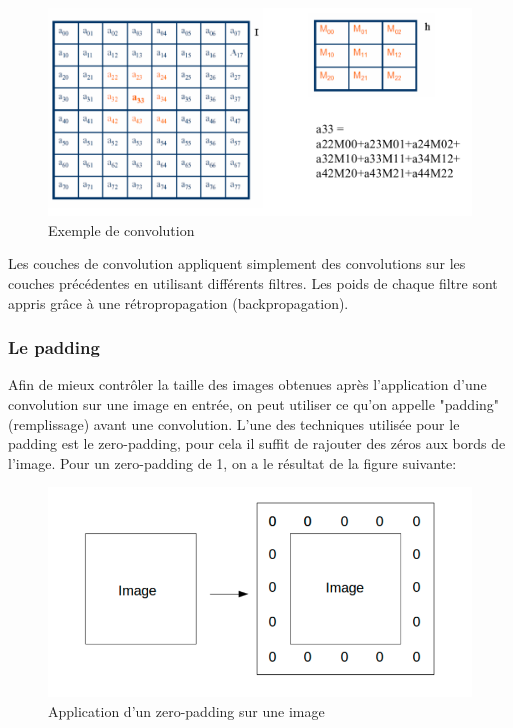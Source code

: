 \begin{figure}[H]
	\centering
		\includegraphics[width=5in]{Figures/convAouat.png}
	\caption[An Electron]{Exemple de convolution}
	\label{fig:Electron}
\end{figure}



Les couches de convolution appliquent simplement des convolutions sur les couches précédentes en utilisant différents filtres. Les poids de chaque filtre sont appris grâce à une rétropropagation (backpropagation).

\subsubsection{Le padding}
Afin de mieux contrôler la taille des images obtenues après l'application d'une convolution sur une image en entrée, on peut utiliser ce qu'on appelle "padding" (remplissage) avant une convolution.
L'une des techniques utilisée pour le padding est le zero-padding, pour cela il suffit de rajouter des zéros aux bords de l'image. Pour un zero-padding de 1, on a le résultat de la figure suivante:

\begin{figure}[H]
	\centering
		\includegraphics[width=5in]{Figures/zero-padding.png}
	\caption[An Electron]{Application d'un zero-padding sur une image}
	\label{fig:Electron}
\end{figure}

